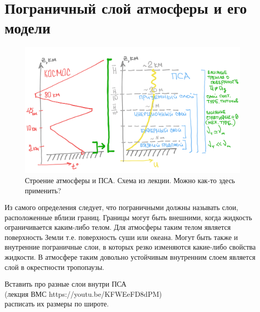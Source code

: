 \chapter{Пограничный слой атмосферы и его модели}



    \begin{figure}[h]
         \centering
         \includegraphics[width=1\linewidth]{pics/ch14_Atmos.png}
    \caption{\label{fig:ch14_Atmos} {\color{red}Строение атмосферы и ПСА. Схема из лекции. Можно как-то здесь применить? }}
    \end{figure}



Из самого определения следует, что пограничными должны называть слои, расположенные вблизи границ. Границы могут быть внешними, когда жидкость ограничивается каким-либо телом. Для атмосферы таким телом является поверхность Земли т.е. поверхность суши или океана. Могут быть также и внутренние пограничные слои, в которых резко изменяются какие-либо свойства жидкости. В атмосфере таким довольно устойчивым внутренним слоем является слой в окрестности тропопаузы. 

\begin{warn}
    Вставить про разные слои внутри ПСА \\
    (лекция ВМС https://youtu.be/KFWEeFD8dPM) \\
    расписать их размеры по широте.
\end{warn}

